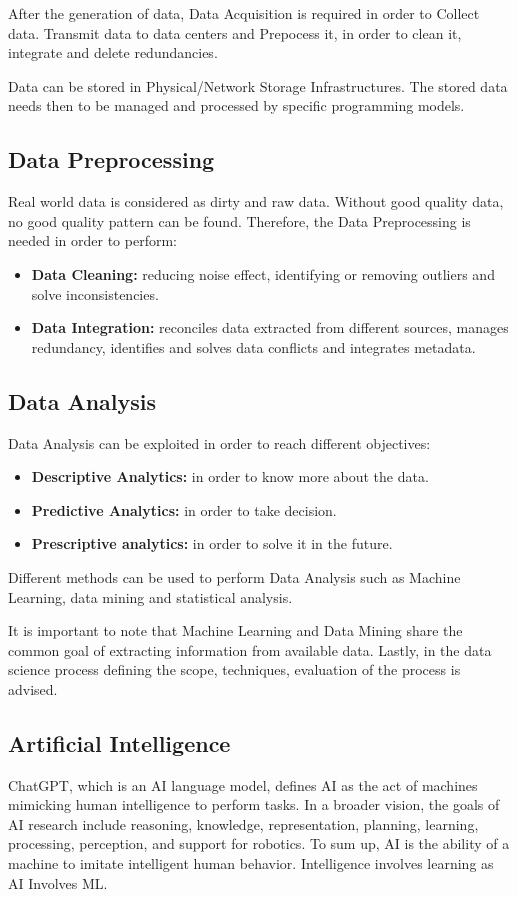 After the generation of data, Data Acquisition is required in order to Collect data. Transmit data to data centers and Prepocess it, in order to clean it, integrate and delete redundancies.

Data can be stored in Physical/Network Storage Infrastructures. The stored data needs then to be managed and processed by specific programming models.

\subsection{Data Preprocessing}
Real world data is considered as dirty and raw data. Without good quality data, no good quality pattern can be found. Therefore, the Data Preprocessing is needed in order to perform:
\begin{itemize}
    \item \textbf{Data Cleaning:} reducing noise effect, identifying or removing outliers and solve inconsistencies.
    \item \textbf{Data Integration:} reconciles data extracted from different sources, manages redundancy, identifies and solves data conflicts and integrates metadata.
\end{itemize}

\subsection{Data Analysis}
Data Analysis can be exploited in order to reach different objectives:
\begin{itemize}
    \item \textbf{Descriptive Analytics:} in order to know more about the data.
    \item \textbf{Predictive Analytics:} in order to take decision.
    \item \textbf{Prescriptive analytics:} in order to solve it in the future.
\end{itemize}

Different methods can be used to perform Data Analysis such as Machine Learning, data mining and statistical analysis.

It is important to note that Machine Learning and Data Mining share the common goal of extracting information from available data. Lastly, in the data science process defining the scope, techniques, evaluation of the process is advised.

\subsection{Artificial Intelligence}
ChatGPT, which is an AI language model, defines AI as the act of machines mimicking human intelligence to perform tasks. In a broader vision, the goals of AI research include reasoning, knowledge, representation, planning, learning, processing, perception, and support for robotics. To sum up, AI is the ability of a machine to imitate intelligent human behavior. Intelligence involves learning as AI Involves ML.

